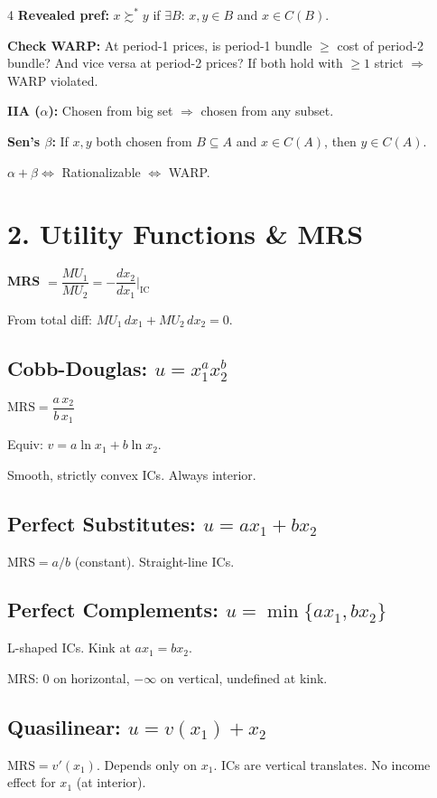 \documentclass[8pt,landscape]{extarticle}
\newcommand{\HI}[1]{\colorbox{yellow!30}{#1}}
\begin{document}
\begin{multicols}{4}
\textbf{Revealed pref:} $x \succsim^* y$ if $\exists B$: $x,y\in B$ and $x\in C(B)$.

\textbf{Check WARP:} At period-1 prices, is period-1 bundle $\geq$ cost of period-2 bundle? And vice versa at period-2 prices? If both hold with $\geq 1$ strict $\Rightarrow$ WARP violated.

\textbf{IIA ($\alpha$):} Chosen from big set $\Rightarrow$ chosen from any subset.

\textbf{Sen's $\beta$:} If $x,y$ both chosen from $B\subseteq A$ and $x\in C(A)$, then $y\in C(A)$.

$\alpha + \beta \Leftrightarrow$ Rationalizable $\Leftrightarrow$ WARP.

\section{2. Utility Functions \& MRS}

\HI{\textbf{MRS}} $= \dfrac{MU_1}{MU_2} = -\dfrac{dx_2}{dx_1}\Big|_{\text{IC}}$

From total diff: $MU_1\,dx_1 + MU_2\,dx_2 = 0$.

\subsection{Cobb-Douglas: $u=x_1^a x_2^b$}
\HI{$\text{MRS} = \dfrac{a\,x_2}{b\,x_1}$}

Equiv: $v = a\ln x_1 + b\ln x_2$.

Smooth, strictly convex ICs. Always interior.

\subsection{Perfect Substitutes: $u=ax_1+bx_2$}
$\text{MRS} = a/b$ (constant). Straight-line ICs.

\subsection{Perfect Complements: $u=\min\{ax_1, bx_2\}$}
L-shaped ICs. Kink at $ax_1 = bx_2$.

MRS: 0 on horizontal, $-\infty$ on vertical, undefined at kink.

\subsection{Quasilinear: $u=v(x_1)+x_2$}
$\text{MRS} = v'(x_1)$. Depends only on $x_1$. ICs are vertical translates. No income effect for $x_1$ (at interior).


\end{multicols}
\end{document}
